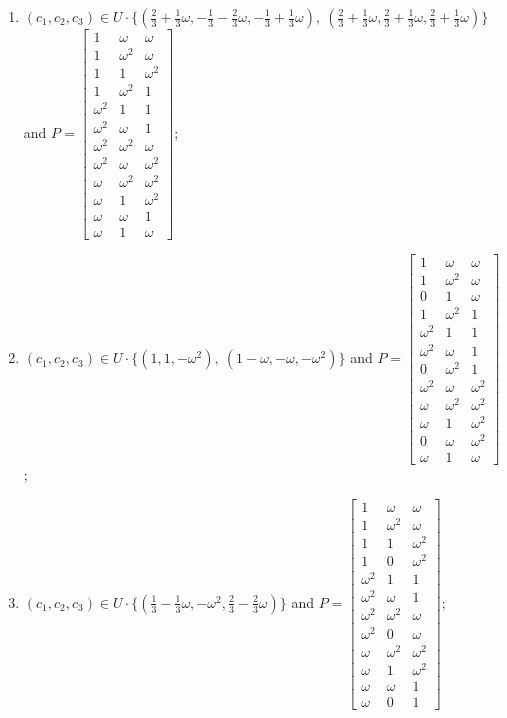 \begin{enumerate}
\item[(f53)\,\newitem] $(c_1,c_2,c_3)\in U\cdot\{(\tfrac{2}{3}+\tfrac{1}{3}\omega,-\tfrac{1}{3}-\tfrac{2}{3}\omega,-\tfrac{1}{3}+\tfrac{1}{3}\omega),\allowbreak\ (\tfrac{2}{3}+\tfrac{1}{3}\omega,\tfrac{2}{3}+\tfrac{1}{3}\omega,\tfrac{2}{3}+\tfrac{1}{3}\omega)\}$ and $P=\begin{bmatrix}1&\omega&\omega\\1&\omega^2&\omega\\1&1&\omega^2\\1&\omega^2&1\\\omega^2&1&1\\\omega^2&\omega&1\\\omega^2&\omega^2&\omega\\\omega^2&\omega&\omega^2\\\omega&\omega^2&\omega^2\\\omega&1&\omega^2\\\omega&\omega&1\\\omega&1&\omega\end{bmatrix}$;
\item[(f54)\,\newitem] $(c_1,c_2,c_3)\in U\cdot\{(1,1,-\omega^2),\allowbreak\ (1-\omega,-\omega,-\omega^2)\}$ and $P=\begin{bmatrix}1&\omega&\omega\\1&\omega^2&\omega\\0&1&\omega\\1&\omega^2&1\\\omega^2&1&1\\\omega^2&\omega&1\\0&\omega^2&1\\\omega^2&\omega&\omega^2\\\omega&\omega^2&\omega^2\\\omega&1&\omega^2\\0&\omega&\omega^2\\\omega&1&\omega\end{bmatrix}$;
\item[(f55)\,\newitem] $(c_1,c_2,c_3)\in U\cdot\{(\tfrac{1}{3}-\tfrac{1}{3}\omega,-\omega^2,\tfrac{2}{3}-\tfrac{2}{3}\omega)\}$ and $P=\begin{bmatrix}1&\omega&\omega\\1&\omega^2&\omega\\1&1&\omega^2\\1&0&\omega^2\\\omega^2&1&1\\\omega^2&\omega&1\\\omega^2&\omega^2&\omega\\\omega^2&0&\omega\\\omega&\omega^2&\omega^2\\\omega&1&\omega^2\\\omega&\omega&1\\\omega&0&1\end{bmatrix}$;

\end{enumerate}
